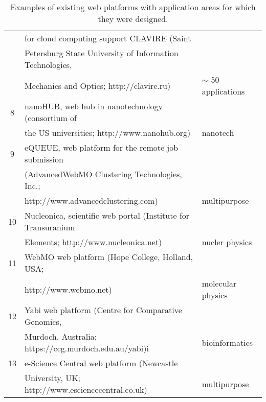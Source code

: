 \documentclass[procedia]{easychair}
\begin{document}
\begin{table}[htp]
\begin{centering}
\begin{tabular}{|c|l|l|}
	      & for cloud computing support CLAVIRE \cite{17} (Saint & \\
	      & Petersburg State University of Information Technologies, & \\
	      & Mechanics and Optics; http://clavire.ru) & $\sim$ 50 applications \\
	    \hline
	    8 & nanoHUB, web hub in nanotechnology \cite{18} (consortium of &\\
	      & the US universities; http://www.nanohub.org) & nanotech \\
	    \hline
	    9 & eQUEUE, web platform for the remote job submission & \\
	      & (AdvancedWebMO Clustering Technologies, Inc.; & \\
	      & http://www.advancedclustering.com) & multipurpose\\
	    \hline
	   10 & Nucleonica, scientific web portal (Institute for Transuranium & \\
	      & Elements; http://www.nucleonica.net) & nucler physics\\
	    \hline
	   11 & WebMO web platform (Hope College, Holland, USA;& \\
	      &  http://www.webmo.net) & molecular physics\\
	    \hline
	   12 & Yabi web platform \cite{19} (Centre for Comparative Genomics,& \\
	      & Murdoch, Australia; https://ccg.murdoch.edu.au/yabi)i & bioinformatics \\
	    \hline
	   13 & e-Science Central web platform \cite{20} (Newcastle & \\
	      & University, UK; http://www.esciencecentral.co.uk) & multipurpose\\
		\hline
		\end{tabular}
		\caption{Examples of existing web platforms with application areas for which they were designed.}
		\label{tab:examples}
	\end{centering}
\end{table}
\end{document}
